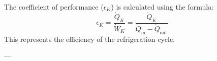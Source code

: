 The coefficient of performance (\( \epsilon_K \)) is calculated using the formula:  
\[
\epsilon_K = \frac{\dot{Q}_K}{\dot{W}_K} = \frac{\dot{Q}_K}{\dot{Q}_{\text{in}} - \dot{Q}_{\text{out}}}
\]  
This represents the efficiency of the refrigeration cycle.

---
